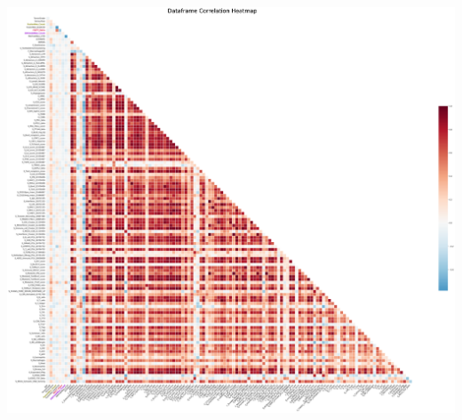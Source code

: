 \documentclass[
  letterpaper,
  DIV=11,
  numbers=noendperiod]{scrartcl}
\begin{document}
\includegraphics[width=35.08333in,height=31.73958in]{xgboost_tuned_files/figure-pdf/cell-22-output-1.png}
\end{document}
